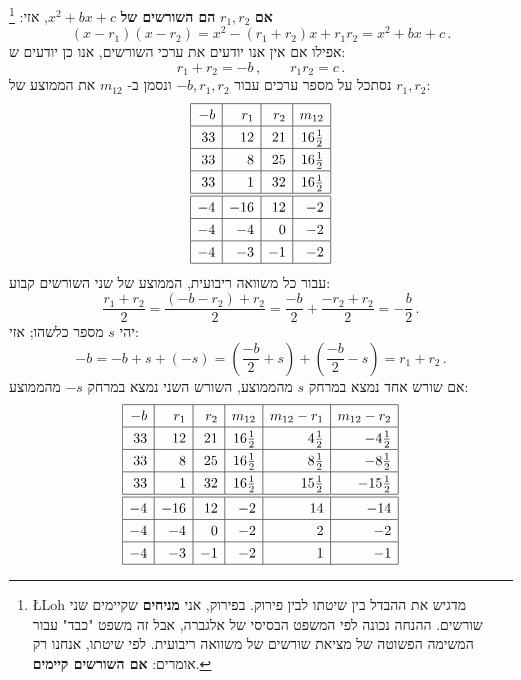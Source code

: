 \documentclass[12pt,a4paper]{article}
\begin{document}
\textbf{אם}
$r_1,r_2$
\textbf{הם השורשים של}
$x^2+bx+c$,
אזי:%
\footnote{%
\L{Loh}
מדגיש את ההבדל בין שיטתו לבין פירוק. בפירוק, אני 
\textbf{מניחים}
שקיימים שני שורשים. ההנחה נכונה לפי המשפט הבסיסי של אלגברה, אבל זה משפט "כבד" עבור המשימה הפשוטה של מציאת שורשים של משוואה ריבועית. לפי שיטתו, אנחנו רק אומרים:
\textbf{אם השורשים קיימים}.%
}
\[
(x-r_1)(x-r_2)=x^2 - (r_1+r_2)x + r_1r_2=x^2+bx+c\,.
\]
אפילו אם אין אנו יודעים את ערכי השורשים, אנו כן יודעים ש:
\[
r_1+r_2 = -b\,,\quad\quad r_1r_2=c\,.
\]
נסתכל על מספר ערכים עבור
$-b,r_1,r_2$
ונסמן ב-%
$m_{12}$
את הממוצע של
$r_1,r_2$:
\[
\renewcommand{\arraystretch}{1.3}
\begin{array}{|r|r|r|r|}
\hline
-b& r_1 & r_2 &m_{12}\\\hline
33 & 12 & 21 & 16\frac{1}{2}\\\hline
33 & 8 & 25 & 16\frac{1}{2}\\\hline
33 & 1 & 32 & 16\frac{1}{2}\\\hline
\hline
-4 & -16 & 12 & -2 \\\hline
-4 & -4 & 0 & -2 \\\hline
-4 & -3 & -1 & -2 \\\hline
\end{array}
\]
עבור כל משוואה ריבועית, הממוצע של שני השורשים קבוע:
\[
\frac{r_1+r_2}{2}=
\frac{(-b-r_2)+r_2}{2}=
\frac{-b}{2}+\frac{-r_2+r_2}{2}=
-\frac{b}{2}\,.
\]
יהי 
$s$ 
מספר כלשהו; אזי:
\[
-b=-b+s+(-s)=\left(\frac{-b}{2}+s\right) + \left(\frac{-b}{2}-s\right)=r_1+r_2\,.
\]
אם שורש אחד נמצא במרחק
$s$
מהממוצע, השורש השני נמצא במרחק
$-s$
מהממוצע:
\[
\renewcommand{\arraystretch}{1.3}
\begin{array}{|r|r|r|r|r|r|}
\hline
-b& r_1 & r_2 & m_{12}& m_{12}-r_1 & m_{12}-r_2\\\hline
33 & 12 & 21 & 16\frac{1}{2}&4\frac{1}{2} & -4\frac{1}{2}  \\\hline
33 & 8 & 25 & 16\frac{1}{2}&8\frac{1}{2}&-8\frac{1}{2}\\\hline
33 & 1 & 32 & 16\frac{1}{2}&15\frac{1}{2}&-15\frac{1}{2}\\\hline
\hline
-4 & -16 & 12 & -2 &14& -14\\\hline
-4 & -4 & 0 & -2&2&-2 \\\hline
-4 & -3 & -1 & -2&1&-1 \\\hline
\end{array}
\]

\bigskip
\end{document}
